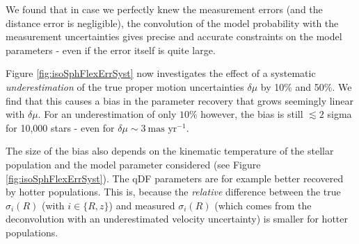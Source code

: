 We found that in case we perfectly knew the measurement errors (and the distance error is negligible), the convolution of the model probability with the measurement uncertainties gives precise and accurate constraints on the model parameters - even if the error itself is quite large.

Figure \ref{fig:isoSphFlexErrSyst} now investigates the effect of a systematic \emph{underestimation} of the true proper motion uncertainties $\delta \mu$ by 10\% and 50\%. We find that this causes a bias in the parameter recovery that grows seemingly linear with $\delta \mu$. For an underestimation of only $10\%$ however, the bias is still $\lesssim 2$ sigma for 10,000 stars \Wilma{[TO DO: Check]} - even for $\delta \mu \sim 3~\text{mas yr}^{-1}$.

The size of the bias also depends on the kinematic temperature of the stellar population and the model parameter considered (see Figure \ref{fig:isoSphFlexErrSyst}). The qDF parameters are for example better recovered by hotter populations. This is, because the \emph{relative} difference between the true $\sigma_i(R)$ (with $i \in \{R,z\}$) and measured $\sigma_i(R)$ (which comes from the deconvolution with an underestimated velocity uncertainty) is smaller for hotter populations. 



